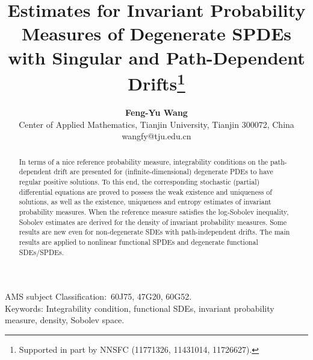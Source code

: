 \documentclass[12pt,leqno]{article}
\title{{\bf Estimates for   Invariant Probability Measures of Degenerate SPDEs with Singular and  Path-Dependent Drifts}\footnote{Supported in
 part by  NNSFC (11771326, 11431014, 11726627).} }
\author{
{\bf     Feng-Yu Wang  }\\
\footnotesize{Center of Applied Mathematics, Tianjin University, Tianjin 300072, China}\\
\footnotesize{  wangfy@tju.edu.cn }}
\theoremstyle{definition}
\newcommand{\scr}[1]{\mathscr #1}
\numberwithin{equation}{section} \theoremstyle{remark}
\newcommand{\ua}{\uparrow}
\begin{document}
\allowdisplaybreaks
\def\R{\mathbb R}  \def\ff{\frac} \def\ss{\sqrt} \def\B{\mathbf
B} \def\W{\mathbb W}
\def\N{\mathbb N} \def\kk{\kappa} \def\m{{\bf m}}
\def\ee{\varepsilon}\def\ddd{D^*}
\def\dd{\delta} \def\DD{\Delta} \def\vv{\varepsilon} \def\rr{\rho}
\def\<{\langle} \def\>{\rangle} \def\GG{\Gamma} \def\gg{\gamma}
  \def\nn{\nabla} \def\pp{\partial} \def\E{\mathbb E}
\def\d{\text{\rm{d}}} \def\bb{\beta} \def\aa{\alpha} \def\D{\scr D}
  \def\si{\sigma} \def\ess{\text{\rm{ess}}}
\def\beg{\begin} \def\beq{\begin{equation}}  \def\F{\scr F}
\def\Ric{\text{\rm{Ric}}} \def\Hess{\text{\rm{Hess}}}
\def\e{\text{\rm{e}}} \def\ua{\underline a} \def\OO{\Omega}  \def\oo{\omega}
 \def\tt{\tilde} \def\Ric{\text{\rm{Ric}}}
\def\cut{\text{\rm{cut}}} \def\P{\mathbb P} \def\ifn{I_n(f^{\bigotimes n})}
\def\C{\scr C}      \def\aaa{\mathbf{r}}     \def\r{r}
\def\gap{\text{\rm{gap}}} \def\prr{\pi_{{\bf m},\varrho}}  \def\r{\mathbf r}
\def\Z{\mathbb Z} \def\vrr{\varrho} \def\ll{\lambda}
\def\L{\scr L}\def\Tt{\tt} \def\TT{\tt}\def\II{\mathbb I}
\def\i{{\rm in}}\def\Sect{{\rm Sect}}  \def\H{\mathbb H}
\def\M{\scr M}\def\Q{\mathbb Q} \def\texto{\text{o}} \def\LL{\Lambda}
\def\Rank{{\rm Rank}} \def\B{\scr B} \def\i{{\rm i}} \def\HR{\hat{\R}^d}
\def\to{\rightarrow}\def\l{\ell}\def\iint{\int}
\def\EE{\scr E}\def\Cut{{\rm Cut}}\def\V{\mathbb V}
\def\A{\scr A} \def\Lip{{\rm Lip}}
\def\BB{\scr B}\def\Ent{{\rm Ent}}\def\L{\scr L}\def\div{{\rm div}}
\maketitle

\begin{abstract}   In terms of a nice reference   probability measure,  integrability conditions on the  path-dependent drift are presented for (infinite-dimensional) degenerate   PDEs to have regular positive solutions.  To this end, the corresponding stochastic (partial) differential equations are proved  to possess the weak existence and  uniqueness  of   solutions,  as well as the  existence, uniqueness  and entropy estimates  of  invariant probability measures.   When the reference measure satisfies the log-Sobolev inequality,  Sobolev estimates are derived for the density of invariant probability measures. Some results are new even for non-degenerate SDEs with path-independent drifts. The main results are applied to   nonlinear functional  SPDEs and degenerate functional  SDEs/SPDEs.

\end{abstract} \noindent
 AMS subject Classification:\  60J75, 47G20, 60G52.   \\
\noindent
 Keywords: Integrability condition, functional SDEs, invariant probability measure,  density, Sobolev space.
 \vskip 2cm
\end{document}
